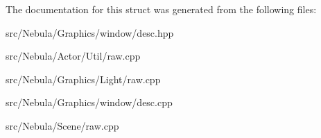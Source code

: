 \-The documentation for this struct was generated from the following files\-:\begin{DoxyCompactItemize}
\item 
src/\-Nebula/\-Graphics/window/desc.\-hpp\item 
src/\-Nebula/\-Actor/\-Util/raw.\-cpp\item 
src/\-Nebula/\-Graphics/\-Light/raw.\-cpp\item 
src/\-Nebula/\-Graphics/window/desc.\-cpp\item 
src/\-Nebula/\-Scene/raw.\-cpp\end{DoxyCompactItemize}

